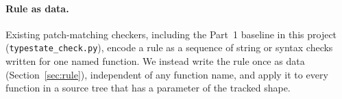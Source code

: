 \paragraph{Rule as data.} Existing patch-matching checkers, including the
Part~1 baseline in this project (\texttt{typestate\_check.py}), encode a
rule as a sequence of string or syntax checks written for one named
function. We instead write the rule once as data
(Section~\ref{sec:rule}), independent of any function name, and apply it
to every function in a source tree that has a parameter of the tracked
shape.
